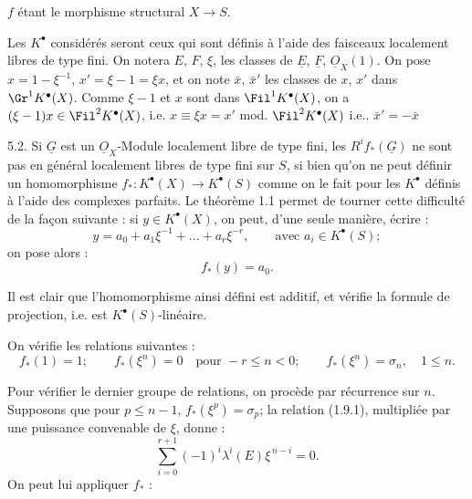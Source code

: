 
$f$
étant le morphisme structural $X\longrightarrow S$.

Les $K^{\bullet}$ considérés seront ceux qui sont définis à l'aide des faisceaux localement libres de type fini. On notera $E$, $F$, $\xi$, les classes de $\underline{E}$, $\underline{F}$, $\underline{O}_X(1)$. On pose $x=1-\xi^{-1}$, $x'=\xi-1=\xi x$, et on note $\bar x$, $\bar x'$ les classes de $x$, $x'$ dans $\Gr^1K^{\bullet}(X)$. Comme $\xi-1$ et $x$ sont dans $\Fil^1K^{\bullet}(X)$, on a $(\xi-1)x\in\Fil^2K^{\bullet}(X)$, i.e. $x\equiv \xi x=x'$ mod. $\Fil^2K^{\bullet}(X)$ i.e.. $\bar x'= -\bar x$

5.2.
Si $\underline{G}$ est un $\underline{O}_X$-Module localement libre de type fini, les $R^if_*(\underline{G})$ ne sont pas en général localement libres de type fini sur $S$, si bien qu'on ne peut définir un homomorphisme $f_*:K^{\bullet}(X)\to K^{\bullet}(S)$ comme on le fait pour les $K^{\bullet}$ définis à l'aide des complexes parfaits. Le théorème 1.1 permet de tourner cette difficulté de la façon suivante : si $y\in K^{\bullet}(X)$, on peut, d'une seule manière, écrire :
\begin{equation}\tag{5.2.1}
  y=a_0+a_1\xi^{-1}+\ldots+a_r\xi^{-r},\qquad \text{avec } a_i\in K^{\bullet}(S);
\end{equation}
on pose alors :
\begin{equation}\tag{5.2.2}
  f_*(y)=a_0 .
\end{equation}

Il est clair que l'homomorphisme ainsi défini est additif, et vérifie la formule de projection, i.e. est $K^{\bullet}(S)$-linéaire.

On vérifie les relations suivantes :
\begin{equation}\tag{5.2.3}
  f_*(1)=1;\qquad
  f_*(\xi^n)=0\quad\text{pour }-r\le n<0;\qquad
  f_*(\xi^n)=\sigma_n,
  \quad 1\le n .
\end{equation}

Pour vérifier le dernier groupe de relations, on procède par récurrence sur $n$. Supposons que pour $p\le n-1$, $f_*(\xi^p)=\sigma_p$; la relation (1.9.1), multipliée par une puissance convenable de $\xi$, donne :
\[
  \sum_{i=0}^{r+1}(-1)^i\lambda^i(E)\xi^{\,n-i}=0 .
\]
On peut lui appliquer $f_*$ :
